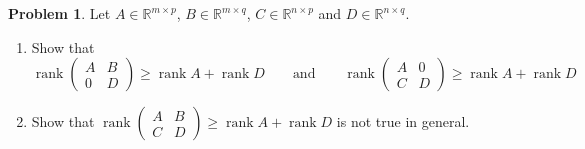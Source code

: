 \documentclass[12pt]{article}
\newcommand{\R}{\mathbb R}
\DeclareMathOperator{\rank}{rank}
\theoremstyle{definition}
\newtheorem{problem}{Problem}
\begin{document}
\begin{problem}\label{r4-pr-block-triangular}
Let \(A\in\R^{m\times p}\), \(B\in\R^{m\times q}\), \(C\in\R^{n\times p}\) and \(D\in\R^{n\times q}\).
\begin{enumerate}
\item Show that
\[
\rank\begin{pmatrix}A&B\\0&D\end{pmatrix}\geqslant\rank A+\rank D\qquad\text{and}\qquad
\rank\begin{pmatrix}A&0\\C&D\end{pmatrix}\geqslant\rank A+\rank D
\]
\item Show that \(\rank\left(\begin{smallmatrix}A&B\\C&D\end{smallmatrix}\right)\geqslant\rank A+\rank D\) is not true in
general.
\end{enumerate}
\end{problem}
\end{document}
